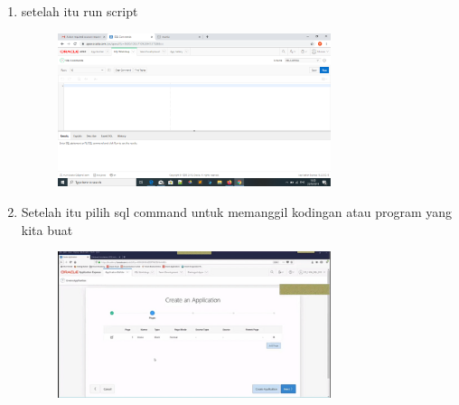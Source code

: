 \documentclass{article}
\begin{document}
\begin{enumerate}
\begin{figure}[h]
            \end{figure}
\item  setelah itu run script
               \begin{figure}[h]
\centerline{\includegraphics[width=8cm]{figure/g1.png}}
            \end{figure}     
\item  Setelah itu pilih sql command untuk memanggil kodingan atau program yang kita buat
               \begin{figure}[h]
\centerline{\includegraphics[width=8cm]{figure/h.png}}
            \end{figure}
            

    
\end{enumerate}
\end{document}
